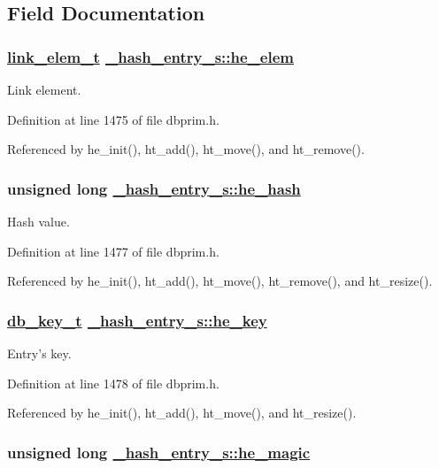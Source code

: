 \subsection{Field Documentation}
\hypertarget{struct__hash__entry__s_o1}{
\subsubsection[he\_\-elem]{\setlength{\rightskip}{0pt plus 5cm}\hyperlink{struct__link__elem__s}{link\_\-elem\_\-t} \hyperlink{struct__hash__entry__s_o1}{\_\-hash\_\-entry\_\-s::he\_\-elem}}}
\label{struct__hash__entry__s_o1}


Link element. 

Definition at line 1475 of file dbprim.h.

Referenced by he\_\-init(), ht\_\-add(), ht\_\-move(), and ht\_\-remove().\hypertarget{struct__hash__entry__s_o3}{
\subsubsection[he\_\-hash]{\setlength{\rightskip}{0pt plus 5cm}unsigned long \hyperlink{struct__hash__entry__s_o3}{\_\-hash\_\-entry\_\-s::he\_\-hash}}}
\label{struct__hash__entry__s_o3}


Hash value. 

Definition at line 1477 of file dbprim.h.

Referenced by he\_\-init(), ht\_\-add(), ht\_\-move(), ht\_\-remove(), and ht\_\-resize().\hypertarget{struct__hash__entry__s_o4}{
\subsubsection[he\_\-key]{\setlength{\rightskip}{0pt plus 5cm}\hyperlink{struct__db__key__s}{db\_\-key\_\-t} \hyperlink{struct__hash__entry__s_o4}{\_\-hash\_\-entry\_\-s::he\_\-key}}}
\label{struct__hash__entry__s_o4}


Entry's key. 

Definition at line 1478 of file dbprim.h.

Referenced by he\_\-init(), ht\_\-add(), ht\_\-move(), and ht\_\-resize().\hypertarget{struct__hash__entry__s_o0}{
\subsubsection[he\_\-magic]{\setlength{\rightskip}{0pt plus 5cm}unsigned long \hyperlink{struct__hash__entry__s_o0}{\_\-hash\_\-entry\_\-s::he\_\-magic}}}
\label{struct__hash__entry__s_o0}


